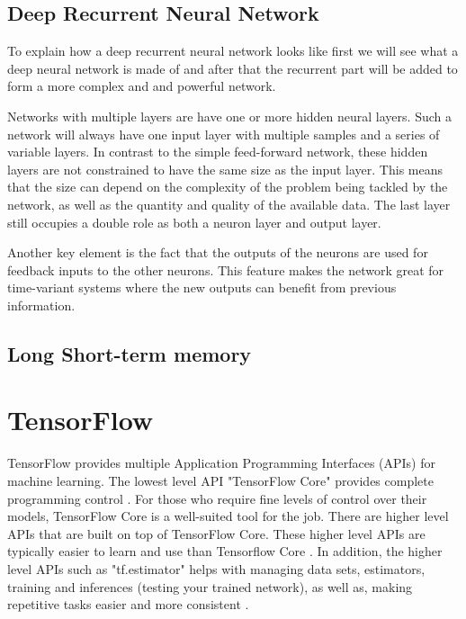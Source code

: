 \subsection{Deep Recurrent Neural Network}
To explain how a deep recurrent neural network looks like first we will see what a deep neural network is made of and after that the recurrent part will be added to form a more complex and and powerful network.

Networks with multiple layers are have one or more hidden neural layers. Such a network will always have one input layer with multiple samples and a series of variable layers.
In contrast to the simple feed-forward network, these hidden layers are not constrained to have the same size as the input layer. This means
that the size can depend on the complexity of the problem being
tackled by the network, as well as the quantity and quality of the available data. The last layer still occupies a double role as both a neuron layer and output layer.

Another key element is the fact that the outputs of the neurons  are used for feedback inputs to the other neurons.
This feature makes the network great for time-variant systems where the new outputs can benefit from previous information.

\subsection{Long Short-term memory}



\section{TensorFlow}
TensorFlow provides multiple Application Programming Interfaces
(APIs) for machine learning. 
The lowest level API "TensorFlow Core" provides complete programming control \cite{tensorflow2015-whitepaper}. 
For those who require fine levels of control over their models,
TensorFlow Core is a well-suited tool for the job. There are higher level APIs that are built on top of TensorFlow Core.
These higher level APIs are typically easier to learn and use than Tensorflow Core \cite{tensorflow2015-whitepaper}.
In addition, the higher level APIs such as "tf.estimator" helps with managing data sets, estimators,
training and inferences (testing your trained network),
as well as, making repetitive tasks easier and more consistent
\cite{tensorflow2015-whitepaper}.\\

